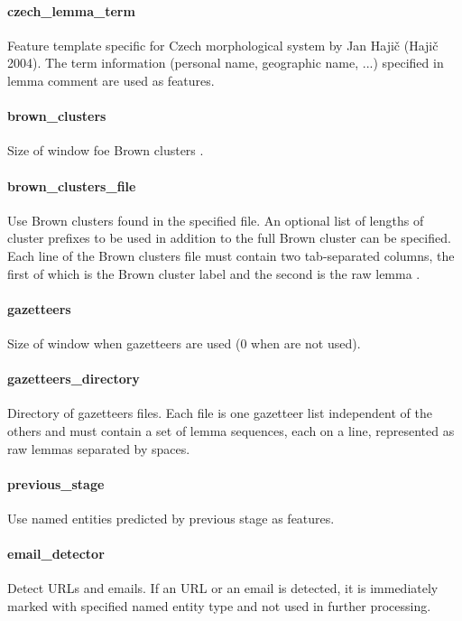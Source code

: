 \paragraph{czech\_lemma\_term}
Feature template specific for Czech morphological system by Jan Hajič (Hajič 2004).
The term information (personal name, geographic name, ...) specified in lemma comment
are used as features.

\paragraph{brown\_clusters}
Size of window foe Brown clusters .

\paragraph{brown\_clusters\_file}
Use Brown clusters found in the specified file. An optional list of lengths of
cluster prefixes to be used in addition to the full Brown cluster can be specified.
Each line of the Brown clusters file must contain two tab-separated columns,
the first of which is the Brown cluster label and the second is the raw lemma .

\paragraph{gazetteers}
Size of window when gazetteers are used (0 when are not used).

\paragraph{gazetteers\_directory}
Directory of gazetteers files. Each file is one gazetteer list independent
of the others and must contain a set of lemma sequences, each on a line,
represented as raw lemmas separated by spaces.

\paragraph{previous\_stage}
Use named entities predicted by previous stage as features.

\paragraph{email\_detector}
Detect URLs and emails. If an URL or an email is detected, it is immediately marked
with specified named entity type and not used in further processing.

